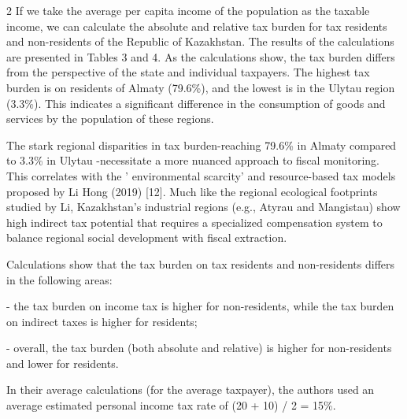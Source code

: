 \begin{multicols}{2}
If we take the average per capita income of the population as the
taxable income, we can calculate the absolute and relative tax burden
for tax residents and non-residents of the Republic of Kazakhstan. The
results of the calculations are presented in Tables 3 and 4. As the
calculations show, the tax burden differs from the perspective of the
state and individual taxpayers. The highest tax burden is on residents
of Almaty (79.6\%), and the lowest is in the Ulytau region (3.3\%). This
indicates a significant difference in the consumption of goods and
services by the population of these regions.

The stark regional disparities in tax burden-reaching 79.6\% in Almaty
compared to 3.3\% in Ulytau -necessitate a more nuanced approach to
fiscal monitoring. This correlates with the
' environmental scarcity'{} and
resource-based tax models proposed by Li Hong (2019) {[}12{]}. Much like
the regional ecological footprints studied by Li, Kazakhstan's
industrial regions (e.g., Atyrau and Mangistau) show high indirect tax
potential that requires a specialized compensation system to balance
regional social development with fiscal extraction.

Calculations show that the tax burden on tax residents and non-residents
differs in the following areas:

- the tax burden on income tax is higher for non-residents, while the
tax burden on indirect taxes is higher for residents;

- overall, the tax burden (both absolute and relative) is higher for
non-residents and lower for residents.

In their average calculations (for the average taxpayer), the authors
used an average estimated personal income tax rate of (20 + 10) / 2 =
15\%.
\end{multicols}

